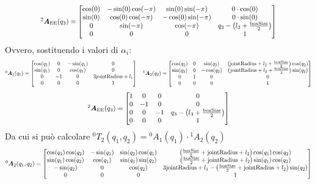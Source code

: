 ﻿\documentclass[11pt, a4paper]{article}
\begin{document}
\[
\scalebox{0.8}{$
^{2}\bm{A}_{\text{EE}}(q_{3}) =
    \begin{bmatrix}
        \cos(0) & -\sin(0)\cos(-\pi) & \sin(0)\sin(-\pi) & 0\cdot\cos(0)\\
        \sin(0) & \cos(0)\cos(-\pi) & -\cos(0)\sin(-\pi) & 0\cdot\sin(0)\\
        0 & \sin(-\pi) & \cos(-\pi) & q_{3} - \left(l_{3} + \frac{\text{boxSize}}{2}\right)\\
        0 & 0 & 0 & 1
    \end{bmatrix}
$}
\]
Ovvero, sostituendo i valori di $\alpha_{i}$:
\[
\scalebox{0.75}{$
^{0}\bm{A}_{1}(q_{1}) =
\begin{bmatrix}
    \cos(q_1) & 0 & -\sin(q_1) & 0\\
    \sin(q_1) & 0 & \cos(q_1) & 0\\
    0 & -1 & 0 & 3\text{jointRadius} + l_{1}\\
    0 & 0 & 0 & 1
\end{bmatrix}
\quad
^{1}\bm{A}_{2}(q_{2}) =
\begin{bmatrix}
    \cos(q_2) & 0 & \sin(q_2) & \left(\text{jointRadius} + l_{2} + \frac{\text{boxSize}}{2}\right)\cos(q_{2})\\
    \sin(q_2) & 0 & -\cos(q_2) & \left(\text{jointRadius} + l_{2} + \frac{\text{boxSize}}{2}\right)\sin(q_{2})\\
    0 & 1 & 0 & 0\\
    0 & 0 & 0 & 1
\end{bmatrix}
$}
\]
\[
\scalebox{0.8}{$
^{2}\bm{A}_{\text{EE}}(q_{3}) =
\begin{bmatrix}
    1 & 0 & 0 & 0\\
    0 & -1 & 0 & 0\\
    0 & 0 & -1 & q_{3} - \left(l_{3} + \frac{\text{boxSize}}{2}\right)\\
    0 & 0 & 0 & 1
\end{bmatrix}
$}
\]
Da cui si può calcolare ${}^{0}T_{2}(q_{1}, q_{2}) = {}^{0}A_{1}(q_{1}) \cdot {}^{1}A_{2}(q_{2})$
\[
\scalebox{0.8}{$
^{0}\bm{A}_{2}(q_{1}, q_{2}) =
\begin{bmatrix}
    \cos(q_1)\cos(q_2) & -\sin(q_1) & \sin(q_2)\cos(q_1) & \left(\frac{\text{boxSize}}{2} + \text{jointRadius} + l_2\right)\cos(q_1)\cos(q_2) \\
    \sin(q_1)\cos(q_2) & \cos(q_1) & \sin(q_1)\sin(q_2) & \left(\frac{\text{boxSize}}{2} + \text{jointRadius} + l_2\right)\sin(q_1)\cos(q_2) \\
    -\sin(q_2) & 0 & \cos(q_2) & 3\text{jointRadius} + l_1 - \left(\frac{\text{boxSize}}{2} + \text{jointRadius} + l_2\right)\sin(q_2) \\
    0 & 0 & 0 & 1
\end{bmatrix}
$}
\]
\end{document}

